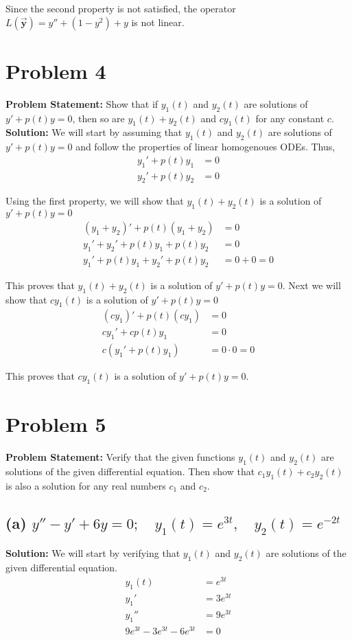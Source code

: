 \documentclass[12pt, letterpaper]{article}
\begin{document}
Since the second property is not satisfied, the operator $L(\vec{\textbf{y}}) = y'' + (1-y^2) + y$ is not linear.

\section*{Problem 4}
\textbf{Problem Statement:} Show that if $y_1(t)$ and $y_2(t)$ are solutions of $y' + p(t)y = 0$, then so are $y_1(t) + y_2(t)$ and $cy_1(t)$ for any constant $c$.
\textbf{Solution:} We will start by assuming that $y_1(t)$ and $y_2(t)$ are solutions of $y' + p(t)y = 0$ and follow the properties of linear homogenoues ODEs. Thus,
\begin{align*}
    y_1' + p(t)y_1 &= 0 \\
    y_2' + p(t)y_2 &= 0
\end{align*}

Using the first property, we will show that $y_1(t) + y_2(t)$ is a solution of $y' + p(t)y = 0$
\begin{align*}
    (y_1 + y_2)' + p(t)(y_1 + y_2) &= 0 \\
    y_1' + y_2' + p(t)y_1 + p(t)y_2 &= 0 \\
    y_1' + p(t)y_1 + y_2' + p(t)y_2 &= 0 + 0 = 0 
\end{align*}

This proves that $y_1(t) + y_2(t)$ is a solution of $y' + p(t)y = 0$. Next we will show that $cy_1(t)$ is a solution of $y' + p(t)y = 0$
\begin{align*}
    (cy_1)' + p(t)(cy_1) &= 0 \\
    cy_1' + cp(t)y_1 &= 0 \\
    c(y_1' + p(t)y_1) &= 0 \cdot 0 = 0 
\end{align*}

This proves that $cy_1(t)$ is a solution of $y' + p(t)y = 0$.

\section*{Problem 5}
\textbf{Problem Statement:} Verify that the given functions $y_1(t)$ and $y_2(t)$ are solutions of the given differential equation. Then show that $c_1y_1(t) + c_2y_2(t)$ is also a solution for any real numbers $c_1$ and $c_2$.
\subsection*{(a) $y'' - y' + 6y = 0; \quad y_1(t) = e^{3t}, \quad y_2(t) = e^{-2t}$}
\textbf{Solution:} We will start by verifying that $y_1(t)$ and $y_2(t)$ are solutions of the given differential equation.
\begin{align*}
    y_1(t) &= e^{3t} \\
    y_1' &= 3e^{3t} \\
    y_1'' &= 9e^{3t} \\
    9e^{3t} - 3e^{3t} - 6e^{3t} &= 0
\end{align*}
\end{document}

